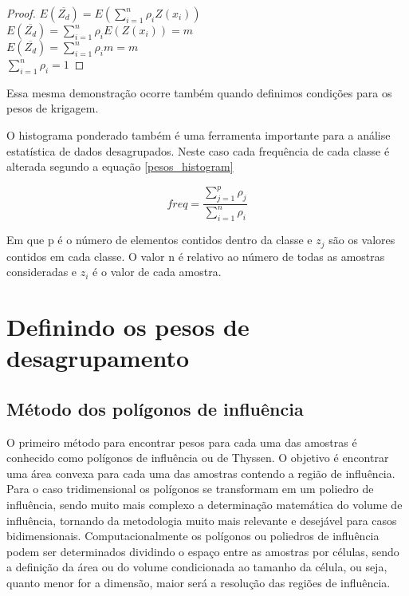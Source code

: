  \begin{proof}
 	$E(\overline{Z_{d}}) = E\left(  \sum_{i=1}^{n} \rho _{i} Z(x_{i}) \right)$\\
 	$E(\overline{Z_{d}}) =  \sum_{i=1}^{n} \rho _{i}E( Z(x_{i})) = m $\\
 	$E(\overline{Z_{d}}) =  \sum_{i=1}^{n} \rho _{i}m = m $\\
 	$ \sum_{i=1}^{n} \rho _{i} = 1 $
 	
 \end{proof}
 
 Essa mesma demonstração ocorre também quando definimos condições para os pesos de krigagem. 
 
 O histograma ponderado também é uma ferramenta importante para a análise estatística de dados desagrupados. Neste caso cada frequência de cada classe é alterada segundo a equação \eqref{pesos_histogram}
 
  \begin{equation}\label{pesos_histogram}
  freq = \frac{\sum_{j=1}^{p} \rho _{j}}{\sum_{i=1}^{n} \rho _{i}} 
  \end{equation}
  
  Em que p é o número de elementos contidos dentro da classe e $z_{j}$ são os valores contidos em cada classe. O valor n é relativo ao número de todas as amostras consideradas e $z_{i}$ é o valor de cada amostra.
 
 \section{Definindo os pesos de desagrupamento}
 
 \subsection{Método dos polígonos de influência}
 
 O primeiro método para encontrar pesos para cada uma das amostras é conhecido como polígonos de influência ou de Thyssen. O objetivo é encontrar uma área convexa para cada uma das amostras contendo a região de influência. Para o caso tridimensional os polígonos se transformam em um poliedro de influência, sendo muito mais complexo a determinação matemática do volume de influência, tornando da metodologia muito mais relevante e desejável para casos bidimensionais. Computacionalmente os polígonos ou poliedros de influência podem ser determinados dividindo o espaço entre as amostras por células, sendo a definição da área ou do volume condicionada ao tamanho da célula, ou seja, quanto menor for a dimensão, maior será a resolução das regiões de influência.
 
